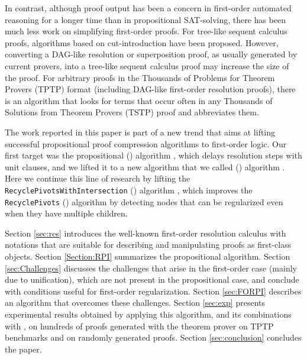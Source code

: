 In contrast, although proof output has been a concern in first-order automated reasoning for a longer time than in propositional SAT-solving, there has been much less work on simplifying first-order proofs. For tree-like sequent calculus proofs, algorithms based on cut-introduction \cite{BrunoLPAR,Hetzl} have been proposed. However, converting a DAG-like resolution or superposition proof, as usually generated by current provers, into a tree-like sequent calculus proof may increase the size of the proof. For arbitrary proofs in the Thousands of Problems for Theorem Provers (TPTP) \cite{TPTP} format (including DAG-like first-order resolution proofs), there is an algorithm \cite{LPARCzech} that looks for terms that occur often in any Thousands of Solutions from Theorem Provers (TSTP) \cite{TPTP} proof and abbreviates them. 


The work reported in this paper is part of a new trend that aims at lifting successful propositional proof compression algorithms to first-order logic. Our first target was the propositional {\LowerUnits} ({\LU}) algorithm \cite{LURPI}, which delays resolution steps with unit clauses, and we lifted it to a new algorithm that we called
{\SFOLowerUnits} 
({\GFOLU}) algorithm \cite{GFOLU}. Here we continue this line of research by lifting the 
\texttt{Recycle\-PivotsWithIntersection}
({\RPI}) algorithm \cite{LURPI}, which improves the \texttt{RecyclePivots} ({\RP}) algorithm \cite{RP08} by detecting nodes that can be regularized even when they have multiple children. 

Section \ref{sec:res} introduces the well-known first-order resolution calculus with notations that are suitable for describing and manipulating proofs as first-class objects. 
Section \ref{Section:RPI} summarizes the propositional {\RPI} algorithm.
Section \ref{sec:Challenges} discusses the challenges that arise in the first-order case (mainly due to unification), which are not present in the propositional case, and conclude with conditions useful for first-order regularization. Section \ref{sec:FORPI} describes an algorithm that overcomes these challenges. Section \ref{sec:exp} presents experimental results obtained by applying this algorithm, and its combinations with {\GFOLU}, on hundreds of proofs generated with the {\SPASS} theorem prover on TPTP benchmarks \cite{TPTP} and on randomly generated proofs. Section \ref{sec:conclusion} concludes the paper.

